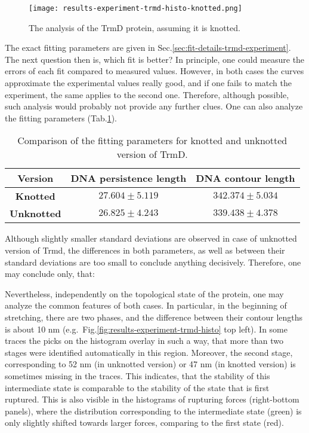 \begin{figure}
    \centering
    \texttt{[image: results-experiment-trmd-histo-knotted.png]}
    \caption{The analysis of the TrmD protein, assuming it is knotted.}
    \label{fig:results-experiment-trmd-histo-knotted}
\end{figure}

The exact fitting parameters are given in Sec.\ref{sec:fit-details-trmd-experiment}.
The next question then is, which fit is better?
In principle, one could measure the errors of each fit compared to measured values.
However, in both cases the curves approximate the experimental values really good, and if one fails to match the experiment, the same applies to the second one.
Therefore, although possible, such analysis would probably not provide any further clues.
One can also analyze the fitting parameters (Tab.\ref{tab:results-experiment-trmd-knotted}).

\begin{table}
    \centering
    \caption{Comparison of the fitting parameters for knotted and unknotted version of TrmD.}
    \label{tab:results-experiment-trmd-knotted}
    \begin{tabular}{c|c|c}
        \textbf{Version} & \textbf{DNA persistence length} & \textbf{DNA contour length}\\\hline
        \textbf{Knotted} & $27.604\pm5.119$ & $342.374\pm5.034$\\
        \textbf{Unknotted} & $26.825\pm4.243$ & $339.438\pm4.378$\\\hline
    \end{tabular}
\end{table}

Although slightly smaller standard deviations are observed in case of unknotted version of Trmd, the differences in both parameters, as well as between their standard deviations are too small to conclude anything decisively.
Therefore, one may conclude only, that:


Nevertheless, independently on the topological state of the protein, one may analyze the common features of both cases.
In particular, in the beginning of stretching, there are two phases, and the difference between their contour lengths is about 10 nm (e.g.\ Fig.\ref{fig:results-experiment-trmd-histo} top left).
In some traces the picks on the histogram overlay in such a way, that more than two stages were identified automatically in this region.
Moreover, the second stage, corresponding to 52 nm (in unknotted version) or 47 nm (in knotted version) is sometimes missing in the traces.
This indicates, that the stability of this intermediate state is comparable to the stability of the state that is first ruptured.
This is also visible in the histograms of rupturing forces (right-bottom panels), where the distribution corresponding to the intermediate state (green) is only slightly shifted towards larger forces, comparing to the first state (red).

